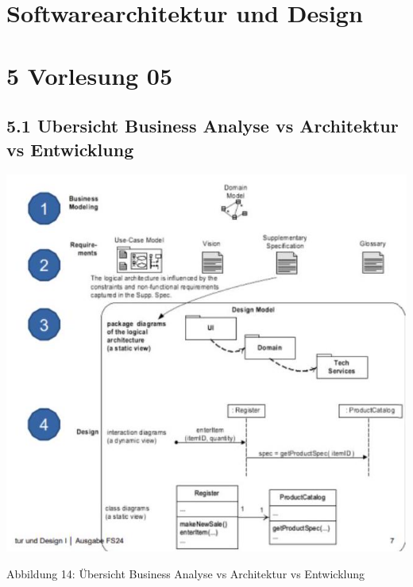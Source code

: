 \section{Softwarearchitektur und Design}

\section*{5 Vorlesung 05}
\subsection*{5.1 Ubersicht Business Analyse vs Architektur vs Entwicklung}
\begin{center}
\includegraphics[width=\linewidth]{images/2024_12_29_0d1d7b5551ea1b4b41bdg-07(2)}
\end{center}

Abbildung 14: Übersicht Business Analyse vs Architektur vs Entwicklung

